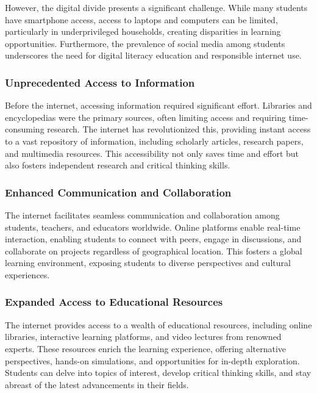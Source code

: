 \documentclass[a4paper,11pt]{article}
\begin{document}
However, the digital divide presents a significant challenge. While many students have smartphone access, access to laptops and computers can be limited, particularly in underprivileged households, creating disparities in learning opportunities.  Furthermore, the prevalence of social media among students underscores the need for digital literacy education and responsible internet use.\cite{student-experience-using-internet}

\subsubsection{Unprecedented Access to Information} 

Before the internet, accessing information required significant effort. Libraries and encyclopedias were the primary sources, often limiting access and requiring time-consuming research. The internet has revolutionized this, providing instant access to a vast repository of information, including scholarly articles, research papers, and multimedia resources. This accessibility not only saves time and effort but also fosters independent research and critical thinking skills.\cite{internet-beneficial-students}

\subsubsection{Enhanced Communication and Collaboration}

The internet facilitates seamless communication and collaboration among students, teachers, and educators worldwide. Online platforms enable real-time interaction, enabling students to connect with peers, engage in discussions, and collaborate on projects regardless of geographical location. This fosters a global learning environment, exposing students to diverse perspectives and cultural experiences.\cite{internet-beneficial-students}

\subsubsection{Expanded Access to Educational Resources}

The internet provides access to a wealth of educational resources, including online libraries, interactive learning platforms, and video lectures from renowned experts. These resources enrich the learning experience, offering alternative perspectives, hands-on simulations, and opportunities for in-depth exploration. Students can delve into topics of interest, develop critical thinking skills, and stay abreast of the latest advancements in their fields.
\end{document}
